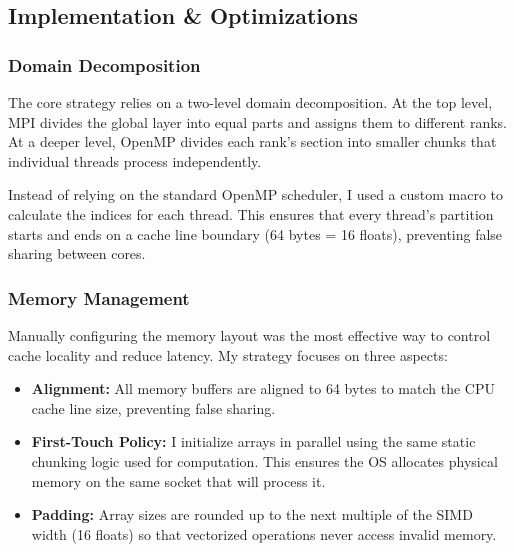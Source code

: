 \documentclass[10pt,dvipsnames,table,twocolumn]{article}
\begin{document}
\subsection{Implementation \& Optimizations}

\subsubsection{Domain Decomposition}

The core strategy relies on a two-level domain decomposition. At the top level, MPI divides the global layer into equal parts and assigns them to different ranks. At a deeper level, OpenMP divides each rank's section into smaller chunks that individual threads process independently.

Instead of relying on the standard OpenMP scheduler, I used a custom macro to calculate the indices for each thread. This ensures that every thread's partition starts and ends on a cache line boundary (64 bytes = 16 floats), preventing false sharing between cores.


\subsubsection{Memory Management}

Manually configuring the memory layout was the most effective way to control cache locality and reduce latency. My strategy focuses on three aspects:

\begin{itemize}
  \item \textbf{Alignment:} All memory buffers are aligned to 64 bytes to match the CPU cache line size, preventing false sharing.
  \item \textbf{First-Touch Policy:} I initialize arrays in parallel using the same static chunking logic used for computation. This ensures the OS allocates physical memory on the same socket that will process it.
  \item \textbf{Padding:} Array sizes are rounded up to the next multiple of the SIMD width (16 floats) so that vectorized operations never access invalid memory.
\end{itemize}
\end{document}
